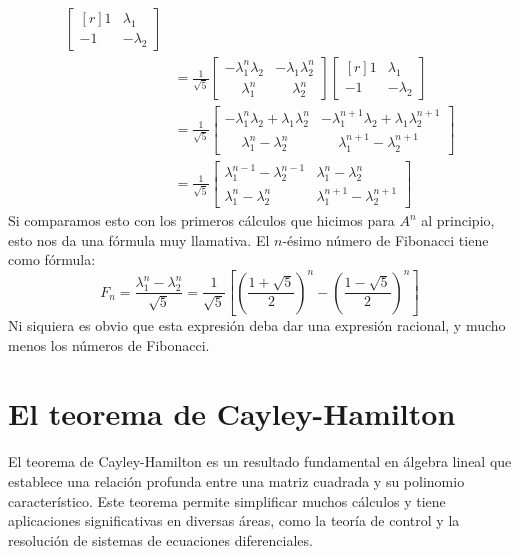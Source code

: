 \begin{example}
\begin{align*}
\begin{bmatrix*}[r]
            1 & \lambda_1 \\
            -1 & -\lambda_2
        \end{bmatrix*} \\
        & = \frac{1}{\sqrt{5}} \begin{bmatrix}
            -\lambda_1^n\lambda_2 & -\lambda_1\lambda_2^n \\
            \phantom{-} \lambda_1^n & \phantom{-} \lambda_2^n
        \end{bmatrix} \begin{bmatrix*}[r]
            1 & \lambda_1 \\
            -1 & -\lambda_2
        \end{bmatrix*} \\
        & = \frac{1}{\sqrt{5}} \begin{bmatrix}
            -\lambda_1^n\lambda_2 + \lambda_1\lambda_2^n & -\lambda_1^{n+1}\lambda_2 + \lambda_1\lambda_2^{n+1} \\[1.5mm]
            \phantom{-} \lambda_1^n - \lambda_2^n & \phantom{-} \lambda_1^{n+1} - \lambda_2^{n+1}
        \end{bmatrix} \\
        & = \frac{1}{\sqrt{5}} \begin{bmatrix}
            \lambda_1^{n-1} - \lambda_2^{n-1} & \lambda_1^n - \lambda_2^n \\[1.5mm]
            \lambda_1^n - \lambda_2^n & \lambda_1^{n+1} - \lambda_2^{n+1}
        \end{bmatrix}
    \end{align*}
    Si comparamos esto con los primeros cálculos que hicimos para $A^n$ al principio, esto nos da una fórmula muy llamativa. El $n$-ésimo número de Fibonacci tiene como fórmula:
    $$F_n = \frac{\lambda_1^n - \lambda_2^n}{\sqrt{5}} = \frac{1}{\sqrt{5}} \left[ \left( \frac{1 + \sqrt{5}}{2} \right)^n - \left( \frac{1 - \sqrt{5}}{2} \right)^n \right]$$
    Ni siquiera es obvio que esta expresión deba dar una expresión racional, y mucho menos los números de Fibonacci.
\end{example}

\newpage

\section{El teorema de Cayley-Hamilton}

El teorema de Cayley-Hamilton es un resultado fundamental en álgebra lineal que establece una relación profunda entre una matriz cuadrada y su polinomio característico. Este teorema permite simplificar muchos cálculos y tiene aplicaciones significativas en diversas áreas, como la teoría de control y la resolución de sistemas de ecuaciones diferenciales.

